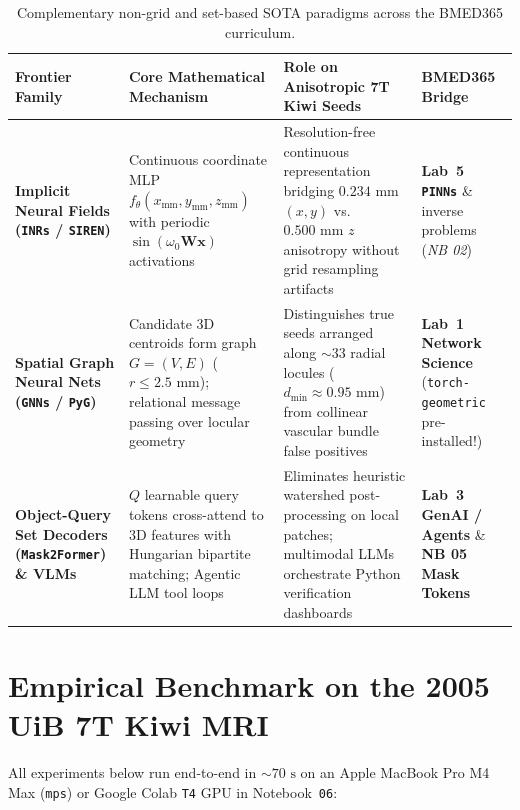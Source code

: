 \documentclass[10.5pt,a4paper]{article}
\begin{document}
\begin{table}[H]
\centering
\scriptsize
\renewcommand{\arraystretch}{1.22}
\begin{tabularx}{\textwidth}{L{3.2cm} Y Y L{2.8cm}}
\toprule
{}
\textbf{Frontier Family} & \textbf{Core Mathematical Mechanism} & \textbf{Role on Anisotropic 7T Kiwi Seeds} & \textbf{BMED365 Bridge} \\
\midrule
\textbf{Implicit Neural Fields (\texttt{INRs} / \texttt{SIREN})} \cite{sitzmann2020siren} & Continuous coordinate MLP $f_\theta(x_{\text{mm}}, y_{\text{mm}}, z_{\text{mm}})$ with periodic $\sin(\omega_0\mathbf{W}\mathbf{x})$ activations & Resolution-free continuous representation bridging $0.234\text{ mm}$ $(x,y)$ vs.\ $0.500\text{ mm}$ $z$ anisotropy without grid resampling artifacts & \textbf{Lab~5 \texttt{PINNs}} \& inverse problems (\emph{NB 02}) \\
\textbf{Spatial Graph Neural Nets (\texttt{GNNs} / \texttt{PyG})} & Candidate 3D centroids form graph $G=(V,E)$ ($r \le 2.5\text{ mm}$); relational message passing over locular geometry & Distinguishes true seeds arranged along $\sim 33$ radial locules ($d_{\min}\approx 0.95\text{ mm}$) from collinear vascular bundle false positives & \textbf{Lab~1 Network Science} (\texttt{torch-geometric} pre-installed!) \\
\textbf{Object-Query Set Decoders (\texttt{Mask2Former}) \& VLMs} & $Q$ learnable query tokens cross-attend to 3D features with Hungarian bipartite matching; Agentic LLM tool loops & Eliminates heuristic watershed post-processing on local patches; multimodal LLMs orchestrate Python verification dashboards & \textbf{Lab~3 GenAI / Agents} \& \textbf{NB 05 Mask Tokens} \\
\bottomrule
\end{tabularx}
\caption{Complementary non-grid and set-based SOTA paradigms across the BMED365 curriculum.}
\end{table}

\newpage
\section{Empirical Benchmark on the 2005 UiB 7T Kiwi MRI}

All experiments below run end-to-end in $\sim 70\text{ s}$ on an Apple MacBook Pro M4 Max (\texttt{mps}) or Google Colab \texttt{T4} GPU in Notebook~\texttt{06}:
\end{document}
